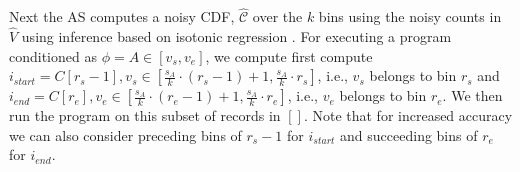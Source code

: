 Next the \textsf{AS} computes a noisy CDF, $\hat{\mathcal{C}}$ over the $k$ bins using the noisy counts in $\hat{V}$ using inference based on isotonic regression \cite{cdf}. For executing a program conditioned as $\phi=A \in [v_s,v_e]$, we compute first compute $i_{start}=C[r_s-1], v_s \in [\frac{s_A}{k}\cdot(r_s-1)+1,\frac{s_A}{k}\cdot r_s]$, i.e., $v_s$ belongs to bin $r_s$   and  $i_{end}=C[r_e], v_e \in [\frac{s_A}{k}\cdot(r_e-1)+1,\frac{s_A}{k}\cdot r_e]$, i.e., $v_e$ belongs to bin $r_e$. We then run the program on this subset of records in $[]$. Note that for increased accuracy we can also consider preceding bins of $r_s-1$ for $i_{start}$ and succeeding bins of $r_e$ for $i_{end}$.
\begin{comment}
For answering queries of the form $\phi=A_1==v_1\wedge \ldots  \wedge A_n==v_n$, ideally we just need to compute for $A_2==v_2\wedge \ldots \wedge A_n==v_n$ on $ct_{A,v}$ number of records starting from position $\sum_{i=1}^{i=v-1}ct_{A,i}$ of $\boldsymbol{\mathcal{\tilde{D}}}_{sort}$. 

However the \textsf{AS} has access only to the noisy CDF over the $k$ bins $ct_{A,i}$. Note that when $\bar{i}_{start}=\bar{\hat{\mathcal{C}}}[v-1] < \sum_{i=1}^{i=v-1}ct_{A,i}$ and $\bar{i}_{end}= \bar{\hat{\mathcal{C}}}[v-1] > i_{start}+ct_{A,v}$, i.e., the indices computed from the noisy values  saddle over the true records satisfying $A==v$, then although we end up loosing in performance a bit, we are still guaranteed to compute the exact non-noisy count for records satisfying $\phi$. 

In all other cases, we end up disregarding some of the records that satisfy $A==v$, some of these rejected records in fact might additionally satisfy $A_1==v_1 \wedge \ldots \wedge A_n==v_n$. Thus we might get inaccurate answer for query predicate $\phi$ (note that here we are talking about the encrypted true count of the given query predicate that is computed by the AS via a series of transformations before applying the LaplaceMechanism primitive).  An effective heuristic to tackle this can be to compensate for the expected laplacian error as follows  $\bar{i}_{start}= \bar{\hat{\mathcal{C}}}[v-1]-\frac{2}{\epsilon}$ and $\bar{i}_{end}=\bar{\hat{\mathcal{C}}}[v]+\frac{2}{\epsilon}$. Also note that answering differentially private  range queries   on attribute $A$ can also be directly done from the noisy CDF $\bar{\hat{\mathcal{C}}}$ 
\end{comment}
